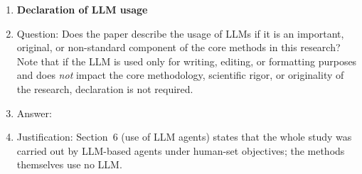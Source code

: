 \begin{enumerate}
\item {\bf Declaration of LLM usage}
    \item[] Question: Does the paper describe the usage of LLMs if it is an important, original, or non-standard component of the core methods in this research? Note that if the LLM is used only for writing, editing, or formatting purposes and does \emph{not} impact the core methodology, scientific rigor, or originality of the research, declaration is not required.
    \item[] Answer: \answerYes{} %
    \item[] Justification: Section~6 (use of LLM agents) states that the whole study was carried out by LLM-based agents under human-set objectives; the methods themselves use no LLM.

\end{enumerate}